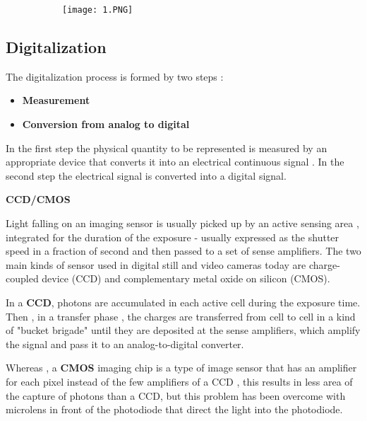 \documentclass{article}
\begin{document}
\vspace{50mm}

\begin{figure}[ht!]
  \centering
  \begin{subfigure}[b]{0.6\linewidth}
    \texttt{[image: 1.PNG]}
  \end{subfigure}
\end{figure}


\subsection{Digitalization}

The digitalization process is formed by two steps : 
\begin{itemize}
    \item \textbf{Measurement}
    \item \textbf{Conversion from analog to digital}
\end{itemize}

In the first step the physical quantity to be represented is measured by an appropriate device that converts it into an electrical continuous signal . In the second step the electrical signal is converted into a digital signal.

\vspace{2mm}
\textbf{CCD/CMOS}

\vspace{2mm}
Light falling on an imaging sensor is usually picked up by an active sensing area , integrated for the duration of the exposure - usually expressed as the shutter speed in a fraction of second and then passed to a set of sense amplifiers. The two main kinds of sensor used in digital still and video cameras today are charge-coupled device (CCD) and complementary metal oxide on silicon (CMOS).

In a \textbf{CCD}, photons are accumulated in each active cell during the exposure time. Then , in a transfer phase , the charges are transferred from cell to cell in a kind of "bucket brigade" until they are deposited at the sense amplifiers, which amplify the signal and pass it to an analog-to-digital converter.

Whereas , a \textbf{CMOS } imaging chip is a type of image sensor that has an amplifier for each pixel instead of the few amplifiers of a CCD , this results in less area of the capture of photons than a CCD, but this problem has been overcome with microlens in front of the photodiode that direct the light into the photodiode.
\end{document}
